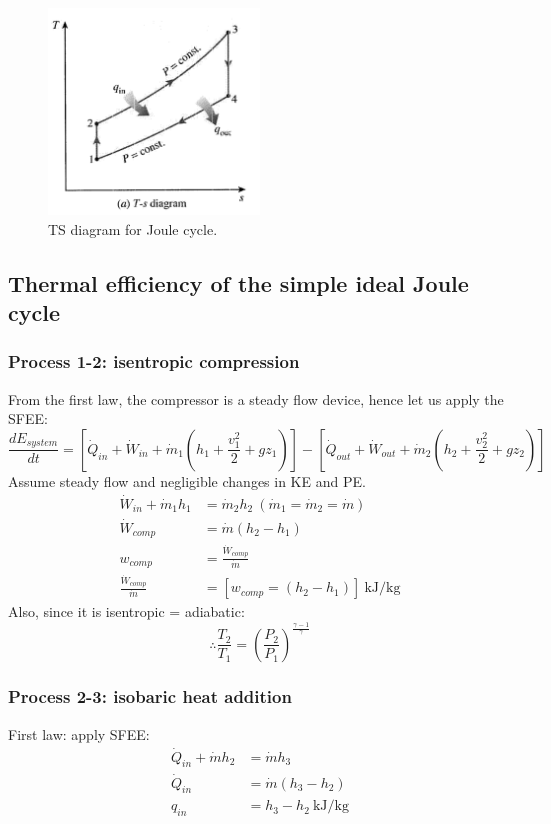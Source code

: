 \documentclass[class=report, crop=false, 12pt,a4paper]{standalone}
\begin{document}
\begin{figure}
  \centering
  \includegraphics[width = 0.5\textwidth]{../img/BraytonTS}
  \caption{TS diagram for Joule cycle.}
\end{figure}
\subsection{Thermal efficiency of the simple ideal Joule cycle}
\subsubsection{Process 1-2: isentropic compression} 
From the first law, the compressor is a steady flow device, hence let us apply the SFEE:
\begin{equation}
  \frac{dE_{system}}{dt} = [\dot{Q}_{in} + \dot{W}_{in} + \dot{m}_1 (h_1 + \frac{v_1^2}{2} + gz_1) ] - [\dot{Q}_{out} + \dot{W}_{out} + \dot{m}_2 (h_2 + \frac{v_2^2}{2} + gz_2) ]
\end{equation}
Assume steady flow and negligible changes in KE and PE.
\begin{align}
  \dot{W}_{in} + \dot{m}_1 h_1 &= \dot{m}_2 h_2 \ (\dot{m}_1 = \dot{m}_2 = \dot{m})\\
  \dot{W}_{comp} &= \dot{m}(h_2 - h_1)\\
  w_{comp} &= \frac{\dot{W}_{comp}}{\dot{m}}\\
  \frac{\dot{W}_{comp}}{\dot{m}} &= [ w_{comp} = (h_2 - h_1)] \ \si{\kilo\joule\per\kg}
\end{align}
Also, since it is isentropic = adiabatic:
\begin{equation}
  \therefore \frac{T_2}{T_1} = \left( \frac{P_2}{P_1} \right)^{\frac{\gamma - 1}{\gamma}}
\end{equation}
\subsubsection{Process 2-3: isobaric heat addition}
First law: apply SFEE:
\begin{align}
  \dot{Q}_{in} + \dot{m} h_2 &= \dot{m} h_3\\
  \dot{Q}_{in} &= \dot{m} (h_3 - h_2)\\
  q_{in} &= h_3 - h_2 \ \si{\kilo\joule\per\kg}
\end{align}
\end{document}
